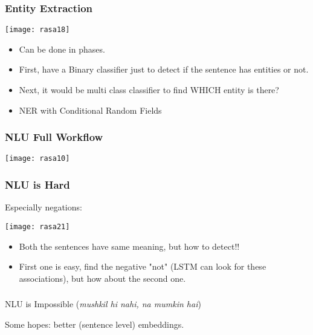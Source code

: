 \begin{frame}[fragile]\frametitle{Entity Extraction}

\begin{center}
\texttt{[image: rasa18]}
\end{center}

\begin{itemize}
\item Can be done in phases.
\item First, have a Binary classifier just to detect if the sentence has entities or not.
\item Next, it would be multi class classifier to find WHICH entity is there?
\item NER with Conditional Random Fields
\end{itemize}
\end{frame}


\begin{frame}[fragile]\frametitle{NLU Full Workflow}


\begin{center}
\texttt{[image: rasa10]}
\end{center}

\end{frame}

\begin{frame}[fragile]\frametitle{NLU is Hard}

Especially negations:

\begin{center}
\texttt{[image: rasa21]}
\end{center}

\begin{itemize}
\item Both the sentences have same meaning, but how to detect!!
\item First one is easy, find the negative "not" (LSTM can look for these associations), but how about the second one.
\end{itemize}

\end{frame}

\begin{frame}[fragile]\frametitle{}

NLU is Impossible (\textit{mushkil hi nahi, na mumkin hai})

Some hopes: better (sentence level) embeddings.
\end{frame}

